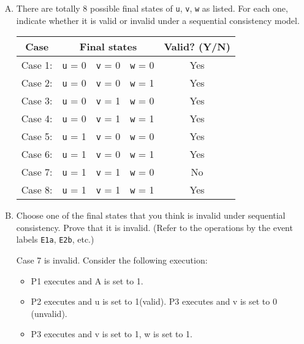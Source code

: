 \documentclass[11pt]{article}
\newenvironment{choice}{\begin{enumerate}[A.]}{\end{enumerate}}
\newenvironment{answer}{\begin{minipage}[c][1.5in]{\textwidth}}{\end{minipage}}
\begin{document}
\begin{choice}
\item There are totally 8 possible final states of \texttt{u}, \texttt{v}, \texttt{w} as listed.
For each one, indicate whether it is valid or invalid under a sequential consistency model.
\begin{center}
\renewcommand{\arraystretch}{1.2}
\begin{tabular}{|c|ccc|c|}
\hline
Case & \multicolumn{3}{|c|}{Final states} & Valid? (Y/N) \\
\hline
Case 1: & \texttt{u} = 0 & \texttt{v} = 0 & \texttt{w} = 0 & 
Yes
\\
\hline
Case 2: & \texttt{u} = 0 & \texttt{v} = 0 & \texttt{w} = 1 &  
Yes
\\
\hline
Case 3: & \texttt{u} = 0 & \texttt{v} = 1 & \texttt{w} = 0 &  
Yes
\\
\hline
Case 4: & \texttt{u} = 0 & \texttt{v} = 1 & \texttt{w} = 1 & 
Yes
\\
\hline
Case 5: & \texttt{u} = 1 & \texttt{v} = 0 & \texttt{w} = 0 &  
Yes
\\ 
\hline
Case 6: & \texttt{u} = 1 & \texttt{v} = 0 & \texttt{w} = 1 &  
Yes
\\
\hline
Case 7: & \texttt{u} = 1 & \texttt{v} = 1 & \texttt{w} = 0 &  
No
\\
\hline
Case 8: & \texttt{u} = 1 & \texttt{v} = 1 & \texttt{w} = 1 &  
Yes
\\
\hline
\end{tabular}
\end{center}

\item 
Choose one of the final states that you think is invalid under sequential consistency.
Prove that it is invalid.  (Refer to the operations by the event labels 
\texttt{E1a}, \texttt{E2b}, etc.)

\begin{answer}
Case 7 is invalid.  Consider the following execution:
\begin{itemize}
\item P1 executes and A is set to 1.
\item P2 executes and u is set to 1(valid). P3 executes and v is set to 0 (unvalid).
\item P3 executes and v is set to 1, w is set to 1.



\end{itemize}
\end{answer}
\end{choice}
\end{document}
